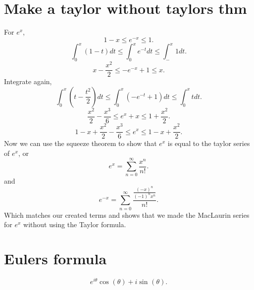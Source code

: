 \section{Make a taylor without taylors thm }%
\label{sec:Make a taylor without taylors thm}
For $ e^{ x } $,
\[
1-x\le e^{ -x } \le 1
.\] 
\[
\int_{ 0 }^{ x } \left( 1-t \right) dt \le \int_{ 0 }^{ x } e^{ -t }dt \le \int_{ - }^{ x } 1dt
.\] 
\[
x-\frac{ x^2 }{ 2 } \le -e^{ -x }+1 \le x
.\] 
Integrate again,
\[
\int_{ 0 }^{ x } \left( t-\frac{ t^2 }{ 2 }  \right) dt\le \int_{ 0 }^{ x } \left( -e^{ -t }+1 \right) dt \le \int_{ 0 }^{ x } tdt
.\] 
\[
\frac{ x^2 }{ 2 } -\frac{ x^3 }{ 6 } \le e^{ x }+x \le 1 + \frac{ x^2 }{ 2 } 
.\] 
\[
1-x + \frac{ x^2 }{ 2 } -\frac{ x^3 }{ 6 } \le e^{ x } \le 1 -x +\frac{ x^2 }{ 2 } 
.\] 
Now we can use the squeeze theorem to show that $ e^{ x } $ is equal to the taylor series of $ e^{ x } $, or 
\[
e^{ x }= \sum_{ n=0 } ^{ \infty } \frac{ x^{ n } }{ n! }
.\] 
and
\[
e^{ -x }=\sum_{ n=0 } ^{ \infty } \frac{ \frac{ \left( -x \right) ^{ n } }{ \left( -1 \right) ^{ n }x^{ n } } }{ n! } 
.\] 
Which matches our created terms and shows that we made the MacLaurin series for $ e^{ x } $ without using the Taylor formula.
\section{Eulers formula}%
\label{sec:Eulers formula}
\[
e^{ i \theta } \cos^{  } \left( \theta \right) + i \sin^{  } \left( \theta \right) 
.\] 
